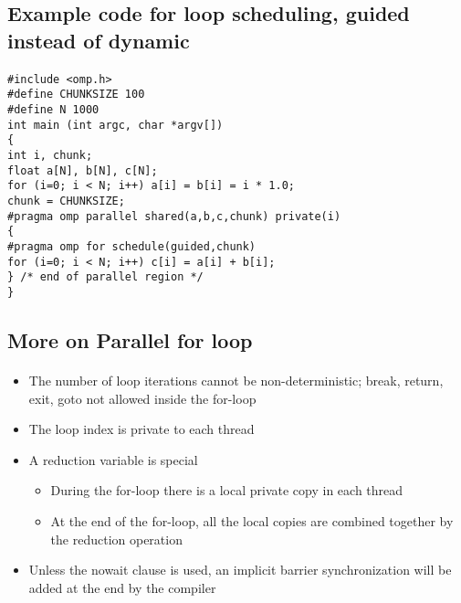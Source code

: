 \documentclass[%
oneside,                 %
final,                   %
10pt]{article}
\begin{document}
\subsection*{Example code for loop scheduling, guided instead of dynamic}

\paragraph{}
















\begin{verbatim}
#include <omp.h>
#define CHUNKSIZE 100
#define N 1000
int main (int argc, char *argv[])
{
int i, chunk;
float a[N], b[N], c[N];
for (i=0; i < N; i++) a[i] = b[i] = i * 1.0;
chunk = CHUNKSIZE;
#pragma omp parallel shared(a,b,c,chunk) private(i)
{
#pragma omp for schedule(guided,chunk)
for (i=0; i < N; i++) c[i] = a[i] + b[i];
} /* end of parallel region */
}

\end{verbatim}



\subsection*{More on Parallel for loop}

\paragraph{}
\begin{itemize}
\item The number of loop iterations cannot be non-deterministic; break, return, exit, goto not allowed inside the for-loop

\item The loop index is private to each thread

\item A reduction variable is special
\begin{itemize}

  \item During the for-loop there is a local private copy in each thread

  \item At the end of the for-loop, all the local copies are combined together by the reduction operation

\end{itemize}

\noindent
\item Unless the nowait clause is used, an implicit barrier synchronization will be added at the end by the compiler
\end{itemize}
\end{document}
